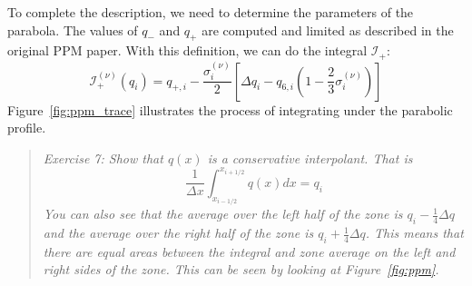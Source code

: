 \documentclass[11pt]{article}
\begin{document}
To complete the description, we need to determine the parameters of
the parabola.  The values of $q_-$ and $q_+$ are computed and limited
as described in the original PPM paper.  With this definition, we can
do the integral $\mathcal{I}_+$:
\begin{equation}
\mathcal{I}_+^{(\nu)}(q_i) = q_{+,i} - \frac{\sigma_i^{(\nu)}}{2} 
   \left [ \Delta q_i - q_{6,i} \left ( 1 - \frac{2}{3} \sigma_i^{(\nu)} \right ) \right ]
\end{equation}
Figure~\ref{fig:ppm_trace} illustrates the process of integrating under
the parabolic profile.


\begin{quote}
{\em Exercise 7: Show that $q(x)$ is a conservative interpolant.  That is
\begin{equation}
\frac{1}{\Delta x} \int_{x_{i-1/2}}^{x_{i+1/2}} q(x) dx = q_i
\end{equation}
You can also see that the average over the left half of the zone is
$q_i -\frac{1}{4}\Delta q$ and the average over the right half of the
zone is $q_i + \frac{1}{4}\Delta q$.  This means that there are equal
areas between the integral and zone average on the left and right
sides of the zone.  This can be seen by looking at
Figure~\ref{fig:ppm}.  }
\end{quote}
\end{document}
